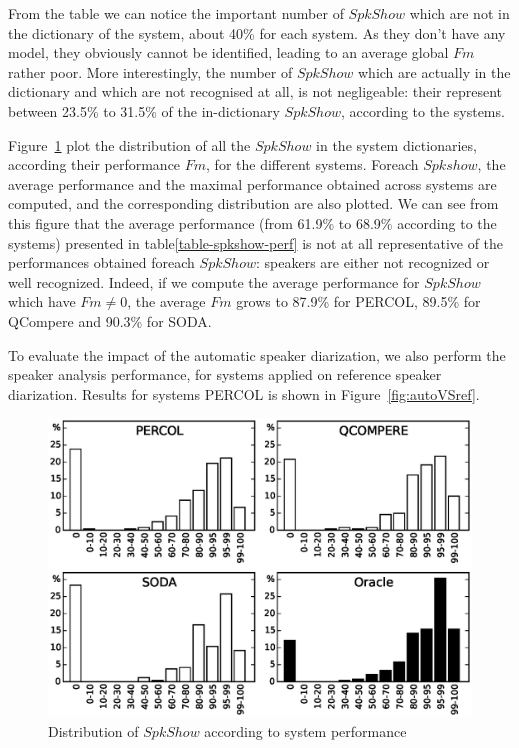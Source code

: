 From the table we can notice the important number of $SpkShow$ which are not in the dictionary of the system, about 40\% for each system. As they don't have any model, they obviously cannot be identified, leading to an average global $Fm$ rather poor. More interestingly, the number of $SpkShow$ which are actually in the dictionary and which are not recognised at all, is not negligeable: their represent between 23.5\% to 31.5\% of the in-dictionary $SpkShow$, according to the systems.


Figure~\ref{fig:FMeasureDistribution} plot the distribution of all the $SpkShow$ in the system dictionaries, according their performance $Fm$, for the different systems. Foreach $Spkshow$, the average performance and the maximal performance obtained across systems are computed, and the corresponding distribution are also plotted. We can see from this figure that the average performance (from 61.9\% to 68.9\% according to the systems) presented in table\ref{table-spkshow-perf} is not at all representative of the performances obtained foreach $SpkShow$: speakers are either not recognized or well recognized. Indeed, if we compute the average performance for $SpkShow$ which have $Fm \neq 0$, the average $Fm$ grows to 87.9\% for PERCOL, 89.5\% for QCompere and 90.3\% for SODA. 


To evaluate the impact of the automatic speaker diarization, we also perform the speaker analysis performance, for systems applied on reference speaker diarization. Results for systems PERCOL is shown in Figure~\ref{fig:autoVSref}.  


\begin{figure}[t]
\centering
\includegraphics[width=\linewidth]{figures/bimodal.eps}
\caption{Distribution of $SpkShow$ according to system performance}
\label{fig:FMeasureDistribution}
\end{figure}


